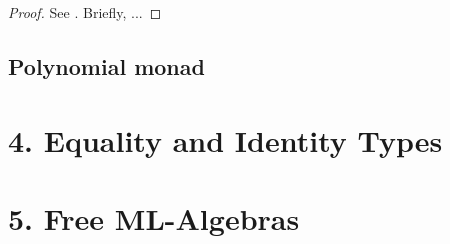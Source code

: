 \documentclass[12pt]{article}
\theoremstyle{remark}
\theoremstyle{definition}
\begin{document}
\begin{proof}
 See \cite{A:NM}. Briefly, ...
\end{proof}

\subsection{Polynomial monad}\label{sec:monad}


\section*{4. Equality and Identity Types}\label{sec:Eq and Id}

\section*{5. Free ML-Algebras}\label{sec:Free ML-Algebras}





\end{document}
